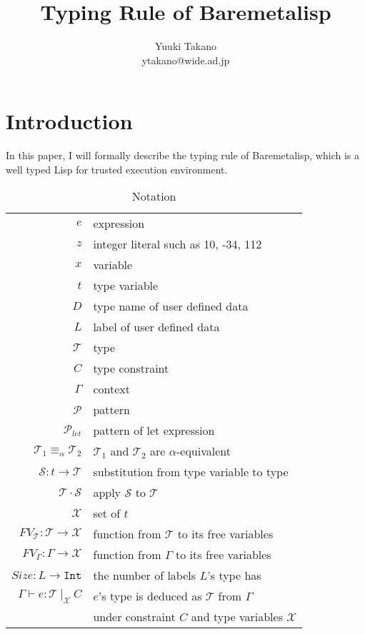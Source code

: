 \documentclass{article}
\title{Typing Rule of Baremetalisp}
\author{Yuuki Takano\\ ytakano@wide.ad.jp}
\begin{document}
\maketitle

\section{Introduction}

In this paper, I will formally describe the typing rule of Baremetalisp,
which is a well typed Lisp for trusted execution environment.

\begin{table}[tb]
    \centering
    \caption{Notation}
    \label{tab:notation}
    \begin{tabular}{rl}
        $e$ & expression \\
        $z$ & integer literal such as 10, -34, 112 \\
        $x$ & variable \\
        $t$ & type variable \\
        $D$ & type name of user defined data \\
        $L$ & label of user defined data \\
        $\mathcal{T}$ & type \\
        $C$ & type constraint \\
        $\Gamma$ & context \\
        $\mathcal{P}$ & pattern \\
        $\mathcal{P}_{let}$ & pattern of let expression \\
        $\mathcal{T}_1 \equiv_\alpha \mathcal{T}_2$ & $\mathcal{T}_1$ and $\mathcal{T}_2$ are $\alpha$-equivalent \\
        $\mathcal{S} : t \rightarrow \mathcal{T}$ & substitution from type variable to type\\
        $\mathcal{T} \cdot \mathcal{S}$ & apply $\mathcal{S}$ to $\mathcal{T}$ \\
        $\mathcal{X}$ & set of $t$ \\
        $FV_\mathcal{T} : \mathcal{T} \rightarrow \mathcal{X}$ & function from $\mathcal{T}$ to its free variables\\
        $FV_\Gamma : \Gamma \rightarrow \mathcal{X}$ & function from $\Gamma$ to its free variables\\
        $Size : L \rightarrow \mathtt{Int}$ & the number of labels $L$'s type has \\
        $\Gamma \vdash e : \mathcal{T}\ |_\mathcal{X}\ C$ & $e$'s type is deduced as $\mathcal{T}$ from $\Gamma$ \\
        & under constraint $C$ and type variables $\mathcal{X}$
    \end{tabular}
\end{table}
\end{document}
